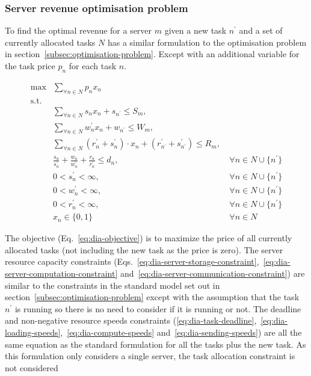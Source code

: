 \subsubsection{Server revenue optimisation problem}
\label{subsubsec:decentralised-iterative-problem}
To find the optimal revenue for a server $m$ given a new task $n^{'}$ and a set of currently allocated tasks $N$ has a
similar formulation to the optimisation problem in section~\ref{subsec:optimisation-problem}. Except with an additional
variable for the task price $p_n$ for each task $n$.

\begin{align}
    \max & \sum_{\forall n \in N} p_n x_n\label{eq:dia-objective}\\
    \mbox{s.t.} \nonumber \\
    & \sum_{\forall n \in N} s_n x_n + s_{n^{'}} \leq S_m,\label{eq:dia-server-storage-constraint}\\
    & \sum_{\forall n \in N} w^{'}_n x_n + w_{n^{'}} \leq W_m, \label{eq:dia-server-computation-constraint}\\
    & \sum_{\forall n \in N} (r^{'}_n + s^{'}_n) \cdot x_n + (r^{'}_{n^{'}} + s^{'}_{n^{'}}) \leq R_m, \label{eq:dia-server-communication-constraint}\\
    & \frac{s_n}{s^{'}_n} + \frac{w_n}{w^{'}_n} + \frac{r_n}{r^{'}_n} \leq d_n, &~ \forall n \in N \cup \{n^{'}\} \label{eq:dia-task-deadline}\\
    & 0 < s^{'}_n < \infty, &~ \forall{n \in N \cup \{n^{'}\}} \label{eq:dia-loading-speeds}\\
    & 0 < w^{'}_n < \infty, &~ \forall{n \in N \cup \{n^{'}\}} \label{eq:dia-compute-speeds}\\
    & 0 < r^{'}_n < \infty, &~ \forall{n \in N \cup \{n^{'}\}} \label{eq:dia-sending-speeds}\\
    & x_n \in \{0,1\} &~ \forall{n \in N} \label{eq:dia-task-allocation}
\end{align}

The objective (Eq.~\eqref{eq:dia-objective}) is to maximize the price of all currently allocated tasks (not including
the new task as the price is zero). The server resource capacity constraints
(Eqs.~\eqref{eq:dia-server-storage-constraint},~\eqref{eq:dia-server-computation-constraint}
and~\eqref{eq:dia-server-communication-constraint}) are similar to the constraints in the standard model set out in
section~\ref{subsec:optimisation-problem} except with the assumption that the task $n^{'}$ is running so there is no
need to consider if it is running or not. The deadline and non-negative resource speeds constraints
(\ref{eq:dia-task-deadline},~\ref{eq:dia-loading-speeds},~\ref{eq:dia-compute-speeds} and~\ref{eq:dia-sending-speeds})
are all the same equation as the standard formulation for all the tasks plus the new task. As this formulation only
considers a single server, the task allocation constraint is not considered

